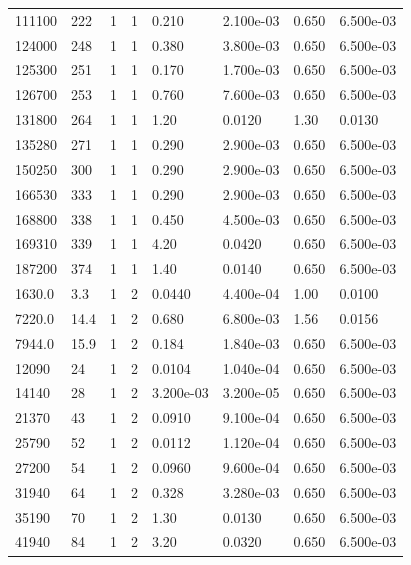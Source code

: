 \documentclass[preview]{standalone}
\begin{document}
{{{\begin{tabular}{L{1.2cm}C{1.2cm} C{0.3cm}C{0.5cm} C{1.4cm}C{1.4cm} C{1.4cm}C{1.4cm}}
  111100  &   222  & 1     &  1 &  0.210  & 2.100e-03  & 0.650 &  6.500e-03   \\ 
  124000  &   248  & 1     &  1 &  0.380  & 3.800e-03  & 0.650 &  6.500e-03   \\ 
  125300  &   251  & 1     &  1 &  0.170  & 1.700e-03  & 0.650 &  6.500e-03   \\ 
  126700  &   253  & 1     &  1 &  0.760  & 7.600e-03  & 0.650 &  6.500e-03   \\ 
  131800  &   264  & 1     &  1 &  1.20  & 0.0120  & 1.30 &  0.0130   \\ 
  135280  &   271  & 1     &  1 &  0.290  & 2.900e-03  & 0.650 &  6.500e-03   \\ 
  150250  &   300  & 1     &  1 &  0.290  & 2.900e-03  & 0.650 &  6.500e-03   \\ 
  166530  &   333  & 1     &  1 &  0.290  & 2.900e-03  & 0.650 &  6.500e-03   \\ 
  168800  &   338  & 1     &  1 &  0.450  & 4.500e-03  & 0.650 &  6.500e-03   \\ 
  169310  &   339  & 1     &  1 &  4.20  & 0.0420  & 0.650 &  6.500e-03   \\ 
  187200  &   374  & 1     &  1 &  1.40  & 0.0140  & 0.650 &  6.500e-03   \\ 
  1630.0  &   3.3  & 1     &  2 &  0.0440  & 4.400e-04  & 1.00 &  0.0100   \\ 
  7220.0  &  14.4  & 1     &  2 &  0.680  & 6.800e-03  & 1.56 &  0.0156   \\ 
  7944.0  &  15.9  & 1     &  2 &  0.184  & 1.840e-03  & 0.650 &  6.500e-03   \\ 
  12090  &    24  & 1     &  2 &  0.0104  & 1.040e-04  & 0.650 &  6.500e-03   \\ 
  14140  &    28  & 1     &  2 &  3.200e-03  & 3.200e-05  & 0.650 &  6.500e-03   \\ 
  21370  &    43  & 1     &  2 &  0.0910  & 9.100e-04  & 0.650 &  6.500e-03   \\ 
  25790  &    52  & 1     &  2 &  0.0112  & 1.120e-04  & 0.650 &  6.500e-03   \\ 
  27200  &    54  & 1     &  2 &  0.0960  & 9.600e-04  & 0.650 &  6.500e-03   \\ 
  31940  &    64  & 1     &  2 &  0.328  & 3.280e-03  & 0.650 &  6.500e-03   \\ 
  35190  &    70  & 1     &  2 &  1.30  & 0.0130  & 0.650 &  6.500e-03   \\ 
  41940  &    84  & 1     &  2 &  3.20  & 0.0320  & 0.650 &  6.500e-03   \\ 

\end{tabular}}}}
\end{document}
